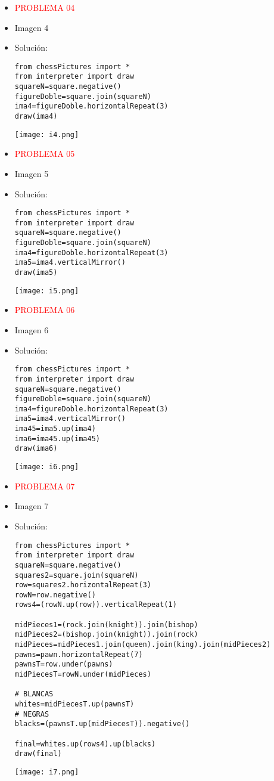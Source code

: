 \documentclass{article}
\begin{document}
\begin{itemize}
    \item \textcolor{red}{PROBLEMA 04}
    \item Imagen 4
    \item Solución:
    \begin{lstlisting}
from chessPictures import *
from interpreter import draw
squareN=square.negative()
figureDoble=square.join(squareN)
ima4=figureDoble.horizontalRepeat(3)
draw(ima4)
    \end{lstlisting}
    \texttt{[image: i4.png]}
\end{itemize}

\begin{itemize}
    \item \textcolor{red}{PROBLEMA 05}
    \item Imagen 5
    \item Solución:
    \begin{lstlisting}
from chessPictures import *
from interpreter import draw
squareN=square.negative()
figureDoble=square.join(squareN)
ima4=figureDoble.horizontalRepeat(3)
ima5=ima4.verticalMirror()
draw(ima5)
    \end{lstlisting}
    \texttt{[image: i5.png]}
\end{itemize}

\begin{itemize}
    \item \textcolor{red}{PROBLEMA 06}
    \item Imagen 6
    \item Solución:
    \begin{lstlisting}
from chessPictures import *
from interpreter import draw
squareN=square.negative()
figureDoble=square.join(squareN)
ima4=figureDoble.horizontalRepeat(3)
ima5=ima4.verticalMirror()
ima45=ima5.up(ima4)
ima6=ima45.up(ima45)
draw(ima6)
    \end{lstlisting}
    \texttt{[image: i6.png]}
\end{itemize}

\begin{itemize}
    \item \textcolor{red}{PROBLEMA 07}
    \item Imagen 7
    \item Solución:
    \begin{lstlisting}
from chessPictures import *
from interpreter import draw
squareN=square.negative()
squares2=square.join(squareN)
row=squares2.horizontalRepeat(3)
rowN=row.negative()
rows4=(rowN.up(row)).verticalRepeat(1)

midPieces1=(rock.join(knight)).join(bishop)
midPieces2=(bishop.join(knight)).join(rock)
midPieces=midPieces1.join(queen).join(king).join(midPieces2)
pawns=pawn.horizontalRepeat(7)
pawnsT=row.under(pawns)
midPiecesT=rowN.under(midPieces)

# BLANCAS
whites=midPiecesT.up(pawnsT)
# NEGRAS
blacks=(pawnsT.up(midPiecesT)).negative()

final=whites.up(rows4).up(blacks)
draw(final)
    \end{lstlisting}
    \texttt{[image: i7.png]}
\end{itemize}
\end{document}

